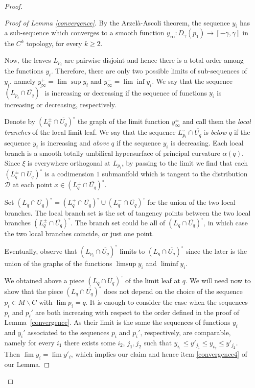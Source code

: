\documentclass[JEP,XML,SOM,Unicode]{cedram}
\let\mathcal\mathscr
\let\moins\smallsetminus
\theoremstyle{definition}
\theoremstyle{remark}
\numberwithin{equation}{section}
\begin{document}
\begin{proof}
\begin{proof}[Proof of Lemma \ref{convergence}]
By the Arzelà-Ascoli theorem, the sequence $y_i$ has a sub-sequence which converges to a smooth function $y_{\infty}: D_{\gamma}(p_1)\to [-\gamma,\gamma]$ in the $C^{k}$ topology, for every $k\geq 2$.

Now, the leaves $L_{p_i}$ are pairwise disjoint and hence
there is a total order among the functions $y_i$. Therefore, there are only two possible limits of sub-sequences of $y_i$, namely
$y_{\infty}^+=\lim\sup y_i$ and $y_{\infty}^-=\lim\inf y_i$.
We say that the sequence $(L_{p_i}\cap \overline{U_q})^{\circ}$ is increasing or decreasing if the sequence of functions $y_i$ is increasing or decreasing, respectively.

Denote by $(L_q^{\pm}\cap \overline{U_q})^{\circ}$ the graph of the limit function $y^{\pm}_{\infty}$ and call them the \emph{local branches} of the local limit leaf. We say that the sequence $L_{p_i}^{\circ}\cap \overline{U_q}$ is \emph{below} $q$ if
the sequence $y_i$ is increasing and \emph{above} $q$ if the sequence $y_i$ is decreasing.
Each local branch is a smooth totally umbilical hypersurface of principal curvature $\alpha(q)$.
Since $\xi$ is everywhere orthogonal at $L_{p_i}$, by passing to the limit we find that each $(L_q^{\pm}\cap U_q)^{\circ}$ is a codimension $1$ submanifold which is tangent to the distribution $\mathcal D$ at each point $x\in (L_q^{\pm}\cap \overline{U_q})^{\circ}$.

Set $(L_q\cap \overline{U_q})^{\circ}=(L_q^{+}\cap \overline{U_q})^{\circ}\cup (L_q^{-}\cap \overline{U_q})^{\circ}$ for the union of the two local branches.
The local branch set is the set of tangency points between
the two local branches $(L_q^{\pm}\cap \overline{U_q})^{\circ}$. The branch set could be all of $(L_q\cap \overline{U_q})^{\circ}$, in which case the two local branches coincide, or just one point.

Eventually, observe that $(L_{p_i}\cap \overline{U_q})^{\circ}$ limits to $(L_q\cap \overline{U_q})^{\circ}$ since the later is
the union of the graphs of the functions $\limsup y_i$ and $\liminf y_i$.

We obtained above a piece $(L_q\cap \overline{U_q})^{\circ}$ of the limit leaf at $q$. We will need now to show that
the piece $(L_q\cap \overline{U_q})^{\circ}$ does not depend on the choice of the sequence $p_i\in M\moins C$ with $\lim p_i=q$.
It is enough to consider the case when the sequences $p_i$ and $p_i'$ are both increasing
with respect to the order defined in the proof of Lemma~\ref{convergence}. As their limit is the same the sequences of functions $y_i$ and $y_i'$
associated to the sequences $p_i$ and $p_i'$, respectively, are comparable, namely for every $i_1$ there exists some $i_2$, $j_1,j_2$ such that
$y_{i_1} \leq y'_{j_1} \leq y_{i_2}\leq y'_{j_2}$. Then $\lim y_i=\lim y'_i$, which implies our claim and hence item \eqref{convergence4} of our Lemma.


\end{proof}
\end{proof}
\end{document}
